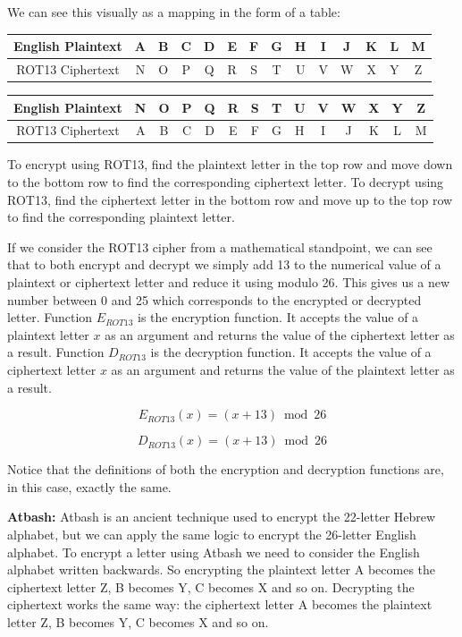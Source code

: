 We can see this visually as a mapping in the form of a table:

\Large
\begin{center}
  \begin{tabular}{|c|c|c|c|c|c|c|c|c|c|c|c|c|c|}
  \hline
    English Plaintext & A & B & C & D & E & F & G & H & I & J & K & L & M \\ \hline
	ROT13 Ciphertext & N & O & P & Q & R & S & T & U & V & W & X & Y & Z \\ \hline
  \end{tabular}
\end{center}

\begin{center}
  \begin{tabular}{|c|c|c|c|c|c|c|c|c|c|c|c|c|c|}
  \hline
    English Plaintext & N & O & P & Q & R & S & T & U & V & W & X & Y & Z \\ \hline
	ROT13 Ciphertext & A & B & C & D & E & F & G & H & I & J & K & L & M \\ \hline
  \end{tabular}
\end{center}

\normalsize

To encrypt using ROT13, find the plaintext letter in the top row and move down to the bottom row to find the corresponding ciphertext letter. To decrypt using ROT13, find the ciphertext letter in the bottom row and move up to the top row to find the corresponding plaintext letter.

If we consider the ROT13 cipher from a mathematical standpoint, we can see that to both encrypt and decrypt we simply add 13 to the numerical value of a plaintext or ciphertext letter and reduce it using modulo 26. This gives us a new number between 0 and 25 which corresponds to the encrypted or decrypted letter. Function $E_{ROT13}$ is the encryption function. It accepts the value of a plaintext letter $x$ as an argument and returns the value of the ciphertext letter as a result. Function $D_{ROT13}$ is the decryption function. It accepts the value of a ciphertext letter $x$ as an argument and returns the value of the plaintext letter as a result.

\[
  E_{ROT13}(x) = (x + 13) \bmod 26
\]

\[
  D_{ROT13}(x) = (x + 13) \bmod 26
\]

Notice that the definitions of both the encryption and decryption functions are, in this case, exactly the same.

{\bf Atbash:} Atbash is an ancient technique used to encrypt the 22-letter Hebrew alphabet, but we can apply the same logic to encrypt the 26-letter English alphabet. To encrypt a letter using Atbash we need to consider the English alphabet written backwards. So encrypting the plaintext letter A becomes the ciphertext letter Z, B becomes Y, C becomes X and so on. Decrypting the ciphertext works the same way: the ciphertext letter A becomes the plaintext letter Z, B becomes Y, C becomes X and so on.

